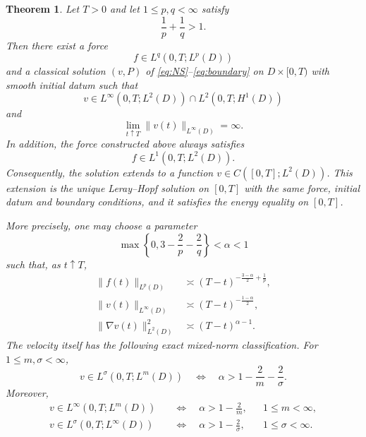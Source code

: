 \documentclass[10pt]{amsart}
\newtheorem{theorem}{Theorem}[section]
\theoremstyle{definition}
\newcommand{\LtLp}[2]{L^{#1}(0,T;L^{#2}(D))}
\begin{document}
\begin{theorem}
\label{thm:main}
Let $T>0$ and let $1\leq p,q<\infty$ satisfy
\begin{equation}
\label{eq:pq-condition}
    \frac1p+\frac1q>1.
\end{equation}
Then there exist a force
\begin{equation}
\label{eq:force-spaces}
    f\in \LtLp{q}{p}
\end{equation}
and a classical solution $(v,P)$ of \eqref{eq:NS}--\eqref{eq:boundary} on
$D\times[0,T)$ with smooth initial datum such that
\begin{equation}
\label{eq:energy-class}
    v\in L^\infty(0,T;L^2(D))\cap L^2(0,T;H^1(D))
\end{equation}
and
\begin{equation}
\label{eq:Linfty-blowup}
    \lim_{t\uparrow T}\|v(t)\|_{L^\infty(D)}=\infty.
\end{equation}
In addition, the force constructed above always satisfies
\begin{equation}
\label{eq:energy-force-extra}
    f\in L^1(0,T;L^2(D)).
\end{equation}
Consequently, the solution extends to a function $v\in C([0,T];L^2(D))$.
This extension is the unique Leray--Hopf solution on $[0,T]$ with the same
force, initial datum and boundary conditions, and it satisfies the energy
equality on $[0,T]$.

More precisely, one may choose a parameter
\begin{equation}
\label{eq:alpha-intro}
    \max\left\{0,3-\frac2p-\frac2q\right\}<\alpha<1
\end{equation}
such that, as $t\uparrow T$,
\begin{align}
\label{eq:rates-intro}
    \|f(t)\|_{L^p(D)}
       &\asymp (T-t)^{-\frac{3-\alpha}{2}+\frac1p},\\
    \|v(t)\|_{L^\infty(D)}
       &\asymp (T-t)^{-\frac{1-\alpha}{2}},\\
    \|\nabla v(t)\|_{L^2(D)}^2
       &\asymp (T-t)^{\alpha-1}.
\end{align}
The velocity itself has the following exact mixed-norm classification.  For
$1\leq m,\sigma<\infty$,
\begin{equation}
\label{eq:velocity-mixed-intro}
    v\in L^\sigma(0,T;L^m(D))
    \quad\Longleftrightarrow\quad
    \alpha>1-\frac2m-\frac2\sigma.
\end{equation}
Moreover,
\begin{equation}
\label{eq:velocity-endpoints-intro}
\begin{aligned}
    v\in L^\infty(0,T;L^m(D))
       &\quad\Longleftrightarrow\quad \alpha>1-\frac2m,
       &&1\leq m<\infty,\\
    v\in L^\sigma(0,T;L^\infty(D))
       &\quad\Longleftrightarrow\quad \alpha>1-\frac2\sigma,
       &&1\leq\sigma<\infty.
\end{aligned}
\end{equation}
\end{theorem}
\end{document}
